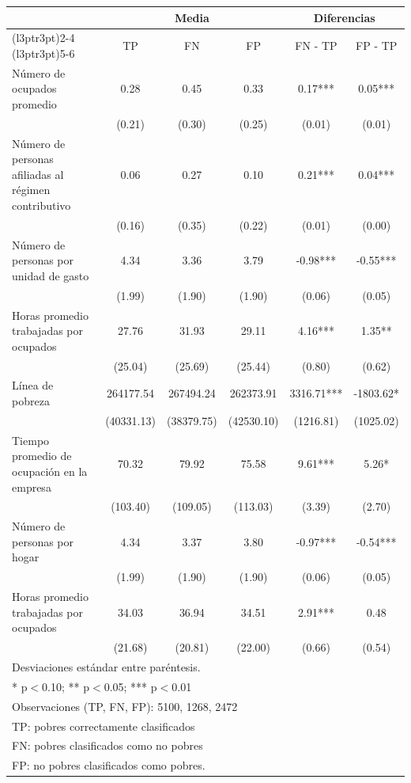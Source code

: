 \centering
\begin{tabular}{lccccc}
\toprule
\multicolumn{1}{c}{ } & \multicolumn{3}{c}{Media} & \multicolumn{2}{c}{Diferencias} \\
\cmidrule(l{3pt}r{3pt}){2-4} \cmidrule(l{3pt}r{3pt}){5-6}
 & TP & FN & FP & FN - TP & FP - TP\\
\midrule
Número de ocupados promedio & 0.28 & 0.45 & 0.33 & 0.17*** & 0.05***\\
 & (0.21) & (0.30) & (0.25) & (0.01) & (0.01)\\
Número de personas afiliadas al régimen contributivo & 0.06 & 0.27 & 0.10 & 0.21*** & 0.04***\\
 & (0.16) & (0.35) & (0.22) & (0.01) & (0.00)\\
Número de personas por unidad de gasto & 4.34 & 3.36 & 3.79 & -0.98*** & -0.55***\\
\addlinespace
 & (1.99) & (1.90) & (1.90) & (0.06) & (0.05)\\
Horas promedio trabajadas por ocupados & 27.76 & 31.93 & 29.11 & 4.16*** & 1.35**\\
 & (25.04) & (25.69) & (25.44) & (0.80) & (0.62)\\
Línea de pobreza & 264177.54 & 267494.24 & 262373.91 & 3316.71*** & -1803.62*\\
 & (40331.13) & (38379.75) & (42530.10) & (1216.81) & (1025.02)\\
\addlinespace
Tiempo promedio de ocupación en la empresa & 70.32 & 79.92 & 75.58 & 9.61*** & 5.26*\\
 & (103.40) & (109.05) & (113.03) & (3.39) & (2.70)\\
Número de personas por hogar & 4.34 & 3.37 & 3.80 & -0.97*** & -0.54***\\
 & (1.99) & (1.90) & (1.90) & (0.06) & (0.05)\\
Horas promedio trabajadas por ocupados & 34.03 & 36.94 & 34.51 & 2.91*** & 0.48\\
\addlinespace
 & (21.68) & (20.81) & (22.00) & (0.66) & (0.54)\\
\bottomrule
\multicolumn{6}{l}{\rule{0pt}{1em}Desviaciones estándar entre paréntesis.}\\
\multicolumn{6}{l}{\rule{0pt}{1em}* p$<$0.10; ** p$<$0.05; *** p$<$0.01}\\
\multicolumn{6}{l}{\rule{0pt}{1em}Observaciones (TP, FN, FP): 5100, 1268, 2472}\\
\multicolumn{6}{l}{\rule{0pt}{1em}TP: pobres correctamente clasificados}\\
\multicolumn{6}{l}{\rule{0pt}{1em}FN: pobres clasificados como no pobres}\\
\multicolumn{6}{l}{\rule{0pt}{1em}FP: no pobres clasificados como pobres.}\\
\end{tabular}

